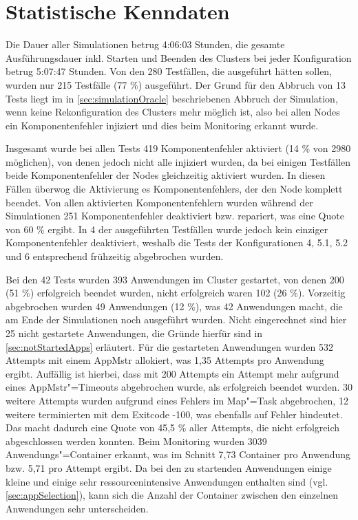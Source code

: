 \section{Statistische Kenndaten}
\label{sec:evaluationStats}

Die Dauer aller Simulationen betrug 4:06:03 Stunden, die gesamte Ausführungsdauer inkl. Starten und Beenden des Clusters bei jeder Konfiguration betrug 5:07:47 Stunden.
Von den 280 Testfällen, die ausgeführt hätten sollen, wurden nur 215 Testfälle (77 \%) ausgeführt.
Der Grund für den Abbruch von 13 Tests liegt im in \autoref{sec:simulationOracle} beschriebenen Abbruch der Simulation, wenn keine Rekonfiguration des Clusters mehr möglich ist, also bei allen Nodes ein Komponentenfehler injiziert und dies beim Monitoring erkannt wurde.

Insgesamt wurde bei allen Tests 419 Komponentenfehler aktiviert (14 \% von 2980 möglichen), von denen jedoch nicht alle injiziert wurden, da bei einigen Testfällen beide Komponentenfehler der Nodes gleichzeitig aktiviert wurden.
In diesen Fällen überwog die Aktivierung es Komponentenfehlers, der den Node komplett beendet.
Von allen aktivierten Komponentenfehlern wurden während der Simulationen 251 Komponentenfehler deaktiviert bzw. repariert, was eine Quote von 60 \% ergibt.
In 4 der ausgeführten Testfällen wurde jedoch kein einziger Komponentenfehler deaktiviert, weshalb die Tests der Konfigurationen 4, 5.1, 5.2 und 6 entsprechend frühzeitig abgebrochen wurden.

Bei den 42 Tests wurden 393 Anwendungen im Cluster gestartet, von denen 200 (51 \%) erfolgreich beendet wurden, nicht erfolgreich waren 102 (26 \%).
Vorzeitig abgebrochen wurden 49 Anwendungen (12 \%), was 42 Anwendungen macht, die am Ende der Simulationen noch ausgeführt wurden.
Nicht eingerechnet sind hier 25 nicht gestartete Anwendungen, die Gründe hierfür sind in \autoref{sec:notStartedApps} erläutert.
Für die gestarteten Anwendungen wurden 532 Attempts mit einem \ac{AppMstr} allokiert, was 1,35 Attempts pro Anwendung ergibt.
Auffällig ist hierbei, dass mit 200 Attempts ein Attempt mehr aufgrund eines \ac{AppMstr}"=Timeouts abgebrochen wurde, als erfolgreich beendet wurden.
30 weitere Attempts wurden aufgrund eines Fehlers im Map"=Task abgebrochen, 12 weitere terminierten mit dem Exitcode -100, was ebenfalls auf Fehler hindeutet.
Das macht dadurch eine Quote von 45,5 \% aller Attempts, die nicht erfolgreich abgeschlossen werden konnten.
Beim Monitoring wurden 3039 Anwendungs"=Container erkannt, was im Schnitt 7,73 Container pro Anwendung bzw. 5,71 pro Attempt ergibt.
Da bei den zu startenden Anwendungen einige kleine und einige sehr ressourcenintensive Anwendungen enthalten sind (vgl. \autoref{sec:appSelection}), kann sich die Anzahl der Container zwischen den einzelnen Anwendungen sehr unterscheiden.

